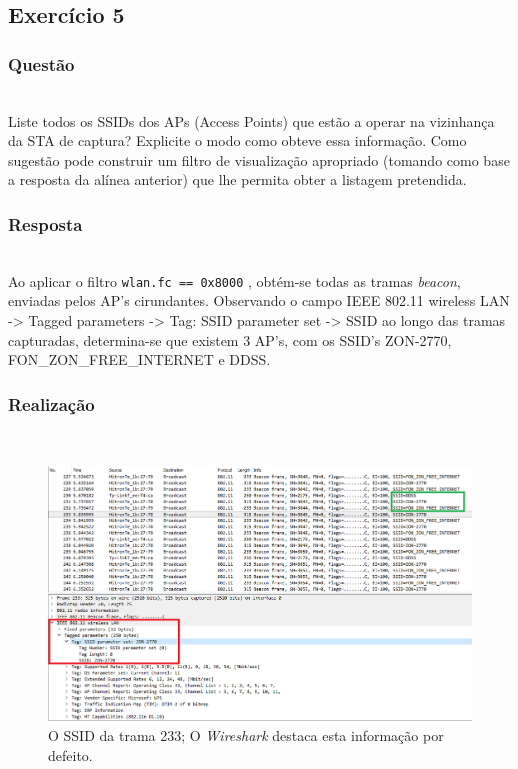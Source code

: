 \documentclass{llncs}
\begin{document}
\clearpage
\subsection{Exercício 5}
\subsubsection{Questão}\rule[-10pt]{0pt}{10pt}\\

Liste todos os SSIDs dos APs (Access Points) que estão a operar na vizinhança da STA de captura? Explicite o modo como obteve essa informação. Como sugestão pode construir um filtro de visualização apropriado (tomando como base a resposta da alínea anterior) que lhe permita obter a listagem pretendida.

\subsubsection{Resposta}\rule[-10pt]{0pt}{10pt}\\

Ao aplicar o filtro \texttt{wlan.fc == 0x8000} , obtém-se todas as tramas \textit{beacon}, enviadas pelos AP's cirundantes. Observando o campo IEEE 802.11 wireless LAN -> Tagged parameters -> Tag: SSID parameter set -> SSID ao longo das tramas capturadas, determina-se que existem 3 AP's, com os SSID's ZON-2770, FON\_ZON\_FREE\_INTERNET e DDSS.

\subsubsection{Realização}\rule[-10pt]{0pt}{10pt}\\

\begin{figure}
  \begin{center}
  \includegraphics[scale=0.35]{imagens/SSID.png} 
  \end{center}
  \caption{O SSID da trama 233; O \textit{Wireshark} destaca esta informação por defeito.}
  \label{fig:ssid_field}
\end{figure}
\end{document}
